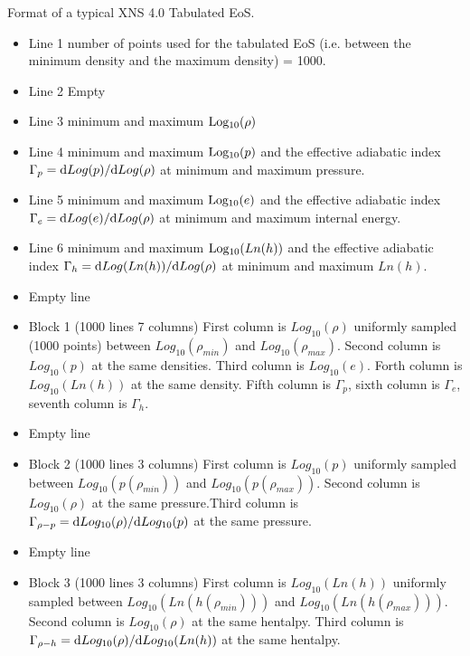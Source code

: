 \documentclass[letterpaper,10pt,english]{sphinxmanual}
\begin{document}
\sphinxAtStartPar
Format of a typical XNS 4.0 Tabulated EoS.
\begin{itemize}
\item {} 
\sphinxAtStartPar
Line 1 \sphinxhyphen{} number of points used for the tabulated EoS (i.e. between the minimum density and the maximum density) = 1000.

\item {} 
\sphinxAtStartPar
Line 2 Empty

\item {} 
\sphinxAtStartPar
Line 3 minimum and maximum \({\rm Log_{10}}(\rho)\)

\item {} 
\sphinxAtStartPar
Line 4 minimum and maximum \({\rm Log_{10}}(p)\) and the effective adiabatic index \(\Gamma_p = {\rm d} Log(p) / {\rm d} Log(\rho)\) at minimum and maximum pressure.

\item {} 
\sphinxAtStartPar
Line 5 minimum and maximum \({\rm Log_{10}}(e)\) and the effective adiabatic index \(\Gamma_e = {\rm d} Log(e) / {\rm d} Log(\rho)\) at minimum and maximum internal energy.

\item {} 
\sphinxAtStartPar
Line 6 minimum and maximum \({\rm Log_{10}}(Ln(h))\) and the effective adiabatic index \(\Gamma_h = {\rm d} Log(Ln(h)) / {\rm d} Log(\rho)\) at minimum and maximum \(Ln(h)\).

\item {} 
\sphinxAtStartPar
Empty line

\item {} 
\sphinxAtStartPar
Block 1 (1000 lines \sphinxhyphen{}  7 columns) \sphinxhyphen{} First column is \(Log_{10}(\rho)\) uniformly sampled (1000 points) between \(Log_{10}(\rho_{min})\) and \(Log_{10}(\rho_{max})\). Second column is \(Log_{10}(p)\) at the same densities. Third column is \(Log_{10}(e)\). Forth column is \(Log_{10}(Ln(h))\) at the same density. Fifth column is \(\Gamma_p\), sixth column is \(\Gamma_e\), seventh column is \(\Gamma_h\).

\item {} 
\sphinxAtStartPar
Empty line

\item {} 
\sphinxAtStartPar
Block 2 (1000 lines \sphinxhyphen{}  3 columns) \sphinxhyphen{} First column is \(Log_{10}(p)\) uniformly sampled between \(Log_{10}(p(\rho_{min}))\) and \(Log_{10}(p(\rho_{max}))\). Second column is \(Log_{10}(\rho)\) at the same pressure.Third column is \(\Gamma_{\rho-p}={\rm d}Log_{10}(\rho)/{\rm d}Log_{10}(p)\) at the same pressure.

\item {} 
\sphinxAtStartPar
Empty line

\item {} 
\sphinxAtStartPar
Block 3 (1000 lines \sphinxhyphen{}  3 columns) \sphinxhyphen{} First column is \(Log_{10}(Ln(h))\) uniformly sampled between \(Log_{10}(Ln(h(\rho_{min})))\) and \(Log_{10}(Ln(h(\rho_{max})))\). Second column is \(Log_{10}(\rho)\) at the same hentalpy. Third column is \(\Gamma_{\rho-h}={\rm d}Log_{10}(\rho)/{\rm d}Log_{10}(Ln(h))\) at the same hentalpy.

\end{itemize}
\end{document}
